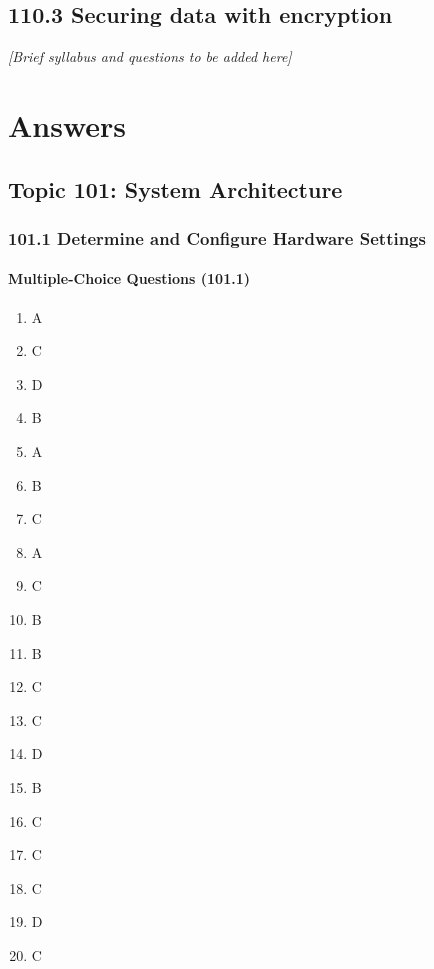 \documentclass[12pt,a4paper]{report}
\begin{document}
\section{110.3 Securing data with encryption}
\textit{[Brief syllabus and questions to be added here]}

\clearpage

\chapter*{Answers} 

\section*{Topic 101: System Architecture}

\subsection*{101.1 Determine and Configure Hardware Settings}
\subsubsection*{Multiple-Choice Questions (101.1)}
\begin{enumerate}[1.]
    \item A
    \item C
    \item D
    \item B
    \item A
    \item B
    \item C
    \item A
    \item C
    \item B
    \item B
    \item C
    \item C
    \item D
    \item B
    \item C
    \item C
    \item C
    \item D
    \item C
    \end{enumerate}
\end{document}
